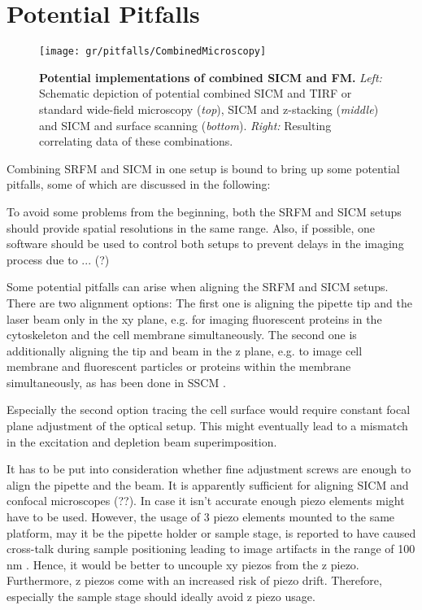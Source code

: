 \section{Potential Pitfalls}
\label{sec:pitfalls}

\begin{figure}
  \sidecaption
  \texttt{[image: gr/pitfalls/CombinedMicroscopy]}%
  \caption{\textbf{Potential implementations of combined SICM and FM.} 
  			\textit{Left:} Schematic depiction of potential combined SICM 
  			and TIRF or standard wide-field microscopy (\textit{top}),
  			SICM and z-stacking (\textit{middle}) and SICM and surface
  			scanning (\textit{bottom}). 
  			\textit{Right:} Resulting correlating data of these combinations.}
  \label{fig:CombinedMicroscopy}
\end{figure}

Combining SRFM and SICM in one setup is bound to bring up some potential
pitfalls, some of which are discussed in the following:

To avoid some problems from the beginning, both the SRFM and SICM setups
should provide spatial resolutions in the same range. Also, if possible, one
software should be used to control both setups to prevent delays in the
imaging process due to ... (?)

Some potential pitfalls can arise when aligning the SRFM and SICM
setups. There are two alignment options: The first one is aligning the pipette
tip and the laser beam only in the xy plane, e.g. for imaging fluorescent
proteins in the cytoskeleton and the cell membrane simultaneously. The second
one is additionally aligning the tip and beam in the z plane, e.g. to image
cell membrane and fluorescent particles or proteins within the membrane
simultaneously, as has been done in SSCM \cite{Gorelik2002a}\cite{Shevchuk2008}.

Especially the second option tracing the cell surface would require constant
focal plane adjustment of the optical setup. This might eventually lead to a
mismatch in the excitation and depletion beam superimposition.

It has to be put into consideration whether fine adjustment screws are enough
to align the pipette and the beam. It is apparently sufficient for aligning
SICM and confocal microscopes (??). In case it isn't accurate enough piezo
elements might have to be used. However, the usage of 3 piezo elements mounted
to the same platform, may it be the pipette holder or sample stage, is
reported to have caused cross-talk during sample positioning leading to image
artifacts in the range of 100 nm \cite{Shevchuk2013}. Hence, it would be
better to uncouple xy piezos from the z piezo. Furthermore, z piezos come with
an increased risk of piezo drift. Therefore, especially the sample stage
should ideally avoid z piezo usage.

